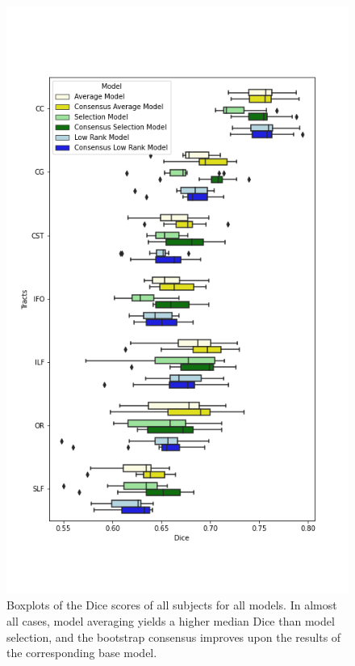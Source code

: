 \begin{figure}
	\centering
	\includegraphics[width=\linewidth]{comparison-dice}
	\caption{Boxplots of the Dice scores of all subjects for all models. In almost all cases, model averaging yields a higher median Dice than model selection, and the bootstrap consensus improves upon the results of the corresponding base model.}
	\label{fig:Dice}
\end{figure}

